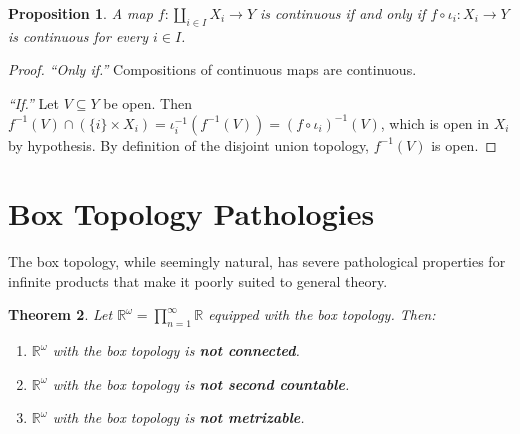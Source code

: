 \documentclass[11pt,a4paper,twoside]{book}
\newtheorem{theorem}{Theorem}[section]
\newtheorem{proposition}[theorem]{Proposition}
\theoremstyle{remark}
\theoremstyle{definition}
\theoremstyle{definition}
\begin{document}
\begin{proposition}\label{prop:coproduct-universal}
A map $f\colon\coprod_{i\in I}X_i\to Y$ is continuous if and only
if $f\circ\iota_i\colon X_i\to Y$ is continuous for every $i\in I$.
\end{proposition}

\begin{proof}
\emph{``Only if.''}\; Compositions of continuous maps are continuous.

\emph{``If.''}\;
Let $V\subseteq Y$ be open.  Then
$f^{-1}(V)\cap(\{i\}\times X_i) = \iota_i^{-1}(f^{-1}(V))
= (f\circ\iota_i)^{-1}(V)$,
which is open in $X_i$ by hypothesis.  By definition of the
disjoint union topology, $f^{-1}(V)$ is open.
\end{proof}

\section{Box Topology Pathologies}\label{sec:box-pathologies}

The box topology, while seemingly natural, has severe pathological
properties for infinite products that make it poorly suited to
general theory.

\begin{theorem}\label{thm:box-pathologies}
Let $\mathbb{R}^\omega=\prod_{n=1}^{\infty}\mathbb{R}$ equipped
with the box topology.  Then:
\begin{enumerate}
\item $\mathbb{R}^\omega$ with the box topology is \textbf{not
      connected}.\label{item:box-not-connected}
\item $\mathbb{R}^\omega$ with the box topology is \textbf{not
      second countable}.\label{item:box-not-2nd-countable}
\item $\mathbb{R}^\omega$ with the box topology is \textbf{not
      metrizable}.\label{item:box-not-metrizable}
\end{enumerate}
\end{theorem}
\end{document}
